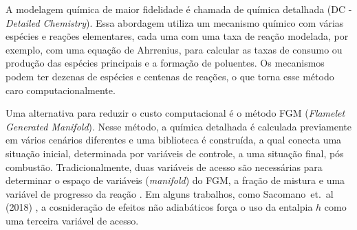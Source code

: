 A modelagem química de maior fidelidade é chamada de química detalhada (DC - \emph{Detailed Chemistry}).
Essa abordagem utiliza um mecanismo químico com várias espécies e reações elementares, cada uma com uma taxa de reação modelada, por exemplo, com uma equação de Ahrrenius, para calcular as taxas de consumo ou produção das espécies principais e a formação de poluentes.
Os mecanismos podem ter dezenas de espécies e centenas de reações, o que torna esse método caro computacionalmente.

Uma alternativa para reduzir o custo computacional é o método FGM (\emph{Flamelet Generated Manifold}). 
Nesse método, a química detalhada é calculada previamente em vários cenários diferentes e uma biblioteca é construída, a qual conecta uma situação inicial, determinada por variáveis de controle, a uma situação final, pós combustão.
Tradicionalmente, duas variáveis de acesso são necessárias para determinar o espaço de variáveis (\emph{manifold}) do FGM, a fração de mistura %
e uma variável de progresso da reação \cite{PetersN2000}.
Em alguns trabalhos, como Sacomano~et.~al (2018) \cite{SacomanoF2018CTM}, a cosnideração de efeitos não adiabáticos força o uso da entalpia $h$ como uma terceira variável de acesso.

